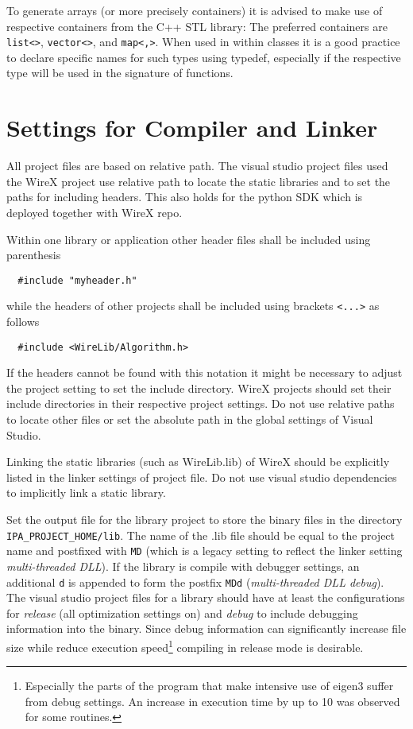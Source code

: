 \documentclass[11pt,a4paper,onepage,openany]{book}
\begin{document}
To generate arrays (or more precisely containers) it is advised to make use of
respective containers from the C++ STL library: The preferred containers are
\texttt{list<>}, \texttt{vector<>}, and \texttt{map<,>}. When used in within
classes it is a good practice to declare specific names for such types using
typedef, especially if the respective type will be used in the signature of
functions.

\section{Settings for Compiler and Linker}%
All project files are based on relative path. The visual studio project files
used the WireX project use relative path to locate the static libraries and 
to set the paths for including headers. This also holds for the python SDK
which is deployed together with WireX repo.

Within one library or application other header files shall be included using
parenthesis
\begin{verbatim}
  #include "myheader.h"
\end{verbatim}
while the headers of other projects shall be included using brackets
\texttt{<...>} as follows
\begin{verbatim}
  #include <WireLib/Algorithm.h>
\end{verbatim}
If the headers cannot be found with this notation it might be necessary to
adjust the project setting to set the include directory. WireX projects should
set their include directories in their respective project settings. Do not use
relative paths to locate other files or set the absolute path in the global
settings of Visual Studio.

Linking the static libraries (such as WireLib.lib) of WireX should be
explicitly listed in the linker settings of project file. Do not use visual
studio dependencies to implicitly link a static library.

Set the output file for the library project to store the binary files in the
directory \texttt{IPA\_PROJECT\_HOME/lib}. The name of the .lib file should be
equal to the project name and postfixed with \texttt{MD} (which is a legacy
setting to reflect the linker setting \emph{multi-threaded DLL}). If the
library is compile with debugger settings, an additional \texttt{d} is appended
to form the postfix \texttt{MDd} (\emph{multi-threaded DLL debug}). The visual
studio project files for a library should have at least the configurations for
\emph{release} (all optimization settings on) and \emph{debug} to include
debugging information into the binary. Since debug information can
significantly increase file size while reduce execution
speed\footnote{Especially the parts of the program that make intensive use of
eigen3 suffer from debug settings. An increase in execution time by up to 10
was observed for some routines.} compiling in release mode is desirable.
\end{document}
